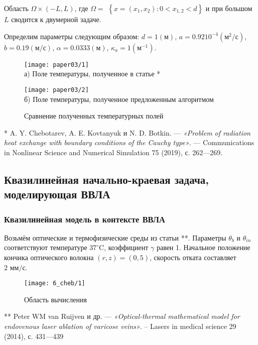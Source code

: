 \begin{frame}
    Область $\Omega \times(-L, L)$,
    где $\Omega=$ $\left\{x=\left(x_{1}, x_{2}\right): 0<x_{1,2}<d\right\}$
    и при большом $L$ сводится к двумерной задаче.

    Определим параметры следующим образом:
    $d=1(\text{м})$, $a=0.9210^{-4}(\text{м}^{2} / \text{с})$,
    $b=0.19(\text{м} / \text{с})$, $\alpha=0.0333(\text{м})$,
    $\kappa_{a}=1\left(\text{м}^{-1}\right)$.
    \begin{figure}[h!t]
        \begin{minipage}[b][][b]{0.49\linewidth}
            \centering
            \texttt{[image: paper03/1]} \\ а) Поле температуры,
            полученное в статье *
        \end{minipage}
        \hfill
        \begin{minipage}[b][][b]{0.49\linewidth}
            \centering
            \texttt{[image: paper03/2]} \\
            б) Поле температуры, полученное предложенным алгоритмом
        \end{minipage}
        \caption{Сравнение полученных температурных полей}
        \label{fig:4_3:1}
    \end{figure}
    \tiny{* A. Y. Chebotarev, A. E. Kovtanyuk и N. D. Botkin. — \textit{«Problem of
    radiation heat exchange with boundary conditions of the Cauchy type»}. —
    Communications in Nonlinear Science and Numerical Simulation 75 (2019),
        с. 262—269.}
\end{frame}

\subsection{Квазилинейная начально-краевая задача, моделирующая ВВЛА}
\begin{frame}
    \frametitle{Квазилинейная модель в контексте ВВЛА}
    Возьмём оптические и термофизические среды из статьи **.
    Параметры $\theta_{b}$ и $\theta_{i n}$ соответствуют
    температуре $37^{\circ} \text{C}$, коэффициент $\gamma$ равен 1.
    Начальное положение кончика оптического волокна $(r, z)=(0,5)$,
    скорость отката составляет $2 \text{~мм} / \text{с}$.

    \begin{figure}[h!t]
        \texttt{[image: 6\_cheb/1]}
        \caption{Область вычисления}
        \label{fig:4_3:3}
    \end{figure}
    \tiny{** Peter WM van Ruijven и др. — \textit{«Optical-thermal mathematical model for
    endovenous laser ablation of varicose veins»}. -- Lasers in medical science
    29 (2014), с. 431—439}
\end{frame}


